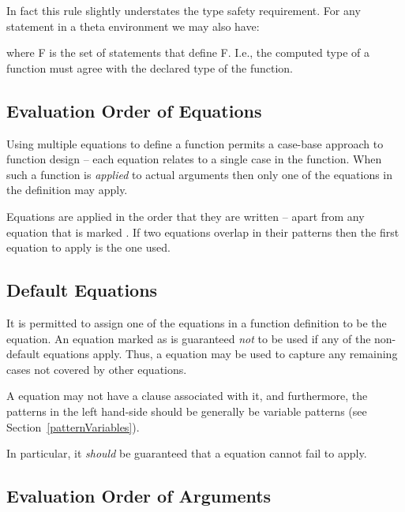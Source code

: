 In fact this rule slightly understates the type safety requirement. For any statement in a theta environment we may also have:
\begin{prooftree}
\end{prooftree}
where F is the set of statements that define F. I.e., the computed type of a function must agree with the declared type of the function.

\subsection{Evaluation Order of Equations}
\label{functionEvaluation}
Using multiple equations to define a function permits a case-base approach to function design -- each equation relates to a single case in the function. When such a function is \emph{applied} to actual arguments then only one of the equations in the definition may apply.


Equations are applied in the order that they are written -- apart from any equation that is marked . If two equations overlap in their patterns then the first equation to apply is the one used.

\subsection{Default Equations}
\label{defaultEquation}

It is permitted to assign one of the equations in a function definition to be the  equation. An equation marked as  is guaranteed \emph{not} to be used if any of the non-default equations apply. Thus, a  equation may be used to capture any remaining cases not covered by other equations.

A  equation may not have a  clause associated with it, and furthermore, the patterns in the left hand-side should be generally be variable patterns (see Section~\vref{patternVariables}). 
\begin{aside}
In particular, it \emph{should} be guaranteed that a  equation cannot fail to apply.
\end{aside}

\subsection{Evaluation Order of Arguments}

